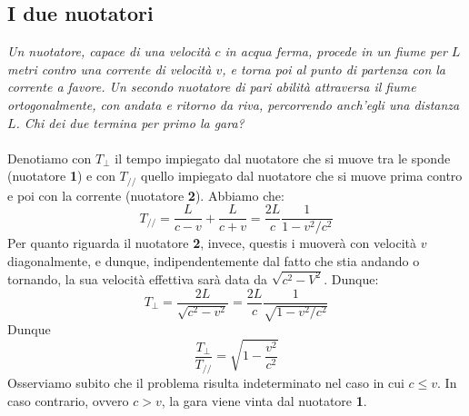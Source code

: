 \documentclass[a4paper,11pt]{book}
\theoremstyle{plain}
\theoremstyle{definition}
\begin{document}
\subsection{I due nuotatori}
\emph{Un nuotatore, capace di una velocità $c$ in acqua ferma, procede in un fiume per $L$ metri contro una corrente di velocità $v$, e torna poi al punto di partenza con la corrente a favore. Un secondo nuotatore di pari abilità attraversa il fiume ortogonalmente, con andata e ritorno da riva, percorrendo anch'egli una distanza $L$. Chi dei due termina per primo la gara?}
\\ \\
Denotiamo con $T_{\perp}$ il tempo impiegato dal nuotatore che si muove tra le sponde (nuotatore \textbf{1}) e con $T_{//}$ quello impiegato dal nuotatore che si muove prima contro e poi con la corrente (nuotatore \textbf{2}). Abbiamo che:
\[
T_{//}=\frac{L}{c-v}+\frac{L}{c+v}=\frac{2L}{c}\frac{1}{1-v^2/c^2}
\] 
Per quanto riguarda il nuotatore \textbf{2}, invece, questis i muoverà con velocità $v$ diagonalmente, e dunque, indipendentemente dal fatto che stia andando o tornando, la sua velocità effettiva sarà data da $\sqrt{c^2-V^2}$. Dunque:
\[
T_{\perp}=\frac{2L}{\sqrt{c^2-v^2}}=\frac{2L}{c}\frac{1}{\sqrt{1-v^2/c^2}}
\]
Dunque
\[
\frac{T_{\perp}}{T_{//}}=\sqrt{1-\frac{v^2}{c^2}}
\]
Osserviamo subito che il problema risulta indeterminato nel caso in cui $c\leq v$. In caso contrario, ovvero $c>v$, la gara viene vinta dal nuotatore \textbf{1}. 
\end{document}
